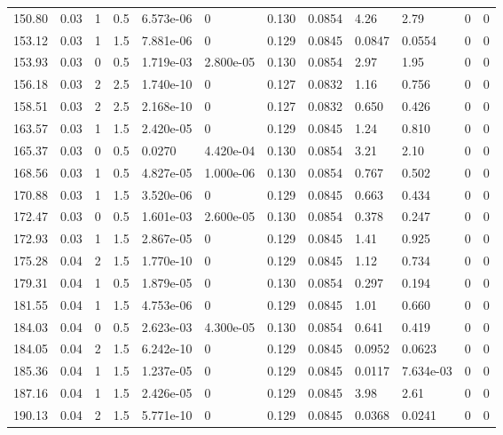 \documentclass[preview]{standalone}
\begin{document}
{{{\begin{tabular}{L{1.2cm}C{1.2cm} C{0.3cm}C{0.5cm} C{1.4cm}C{1.4cm} C{1.4cm}C{1.4cm} C{1.6cm}C{1.6cm} C{1.6cm}C{1.6cm}}
  150.80  &  0.03  & 1     & 0.5 &  6.573e-06  & 0  &  0.130&   0.0854& 4.26 & 2.79   &  0 & 0  \\ 
  153.12  &  0.03  & 1     & 1.5 &  7.881e-06  & 0  &  0.129&   0.0845& 0.0847 & 0.0554   &  0 & 0  \\ 
  153.93  &  0.03  & 0     & 0.5 &  1.719e-03  & 2.800e-05  &  0.130&   0.0854& 2.97 & 1.95   &  0 & 0  \\ 
  156.18  &  0.03  & 2     & 2.5 &  1.740e-10  & 0  &  0.127&   0.0832& 1.16 & 0.756   &  0 & 0  \\ 
  158.51  &  0.03  & 2     & 2.5 &  2.168e-10  & 0  &  0.127&   0.0832& 0.650 & 0.426   &  0 & 0  \\ 
  163.57  &  0.03  & 1     & 1.5 &  2.420e-05  & 0  &  0.129&   0.0845& 1.24 & 0.810   &  0 & 0  \\ 
  165.37  &  0.03  & 0     & 0.5 &  0.0270  & 4.420e-04  &  0.130&   0.0854& 3.21 & 2.10   &  0 & 0  \\ 
  168.56  &  0.03  & 1     & 0.5 &  4.827e-05  & 1.000e-06  &  0.130&   0.0854& 0.767 & 0.502   &  0 & 0  \\ 
  170.88  &  0.03  & 1     & 1.5 &  3.520e-06  & 0  &  0.129&   0.0845& 0.663 & 0.434   &  0 & 0  \\ 
  172.47  &  0.03  & 0     & 0.5 &  1.601e-03  & 2.600e-05  &  0.130&   0.0854& 0.378 & 0.247   &  0 & 0  \\ 
  172.93  &  0.03  & 1     & 1.5 &  2.867e-05  & 0  &  0.129&   0.0845& 1.41 & 0.925   &  0 & 0  \\ 
  175.28  &  0.04  & 2     & 1.5 &  1.770e-10  & 0  &  0.129&   0.0845& 1.12 & 0.734   &  0 & 0  \\ 
  179.31  &  0.04  & 1     & 0.5 &  1.879e-05  & 0  &  0.130&   0.0854& 0.297 & 0.194   &  0 & 0  \\ 
  181.55  &  0.04  & 1     & 1.5 &  4.753e-06  & 0  &  0.129&   0.0845& 1.01 & 0.660   &  0 & 0  \\ 
  184.03  &  0.04  & 0     & 0.5 &  2.623e-03  & 4.300e-05  &  0.130&   0.0854& 0.641 & 0.419   &  0 & 0  \\ 
  184.05  &  0.04  & 2     & 1.5 &  6.242e-10  & 0  &  0.129&   0.0845& 0.0952 & 0.0623   &  0 & 0  \\ 
  185.36  &  0.04  & 1     & 1.5 &  1.237e-05  & 0  &  0.129&   0.0845& 0.0117 & 7.634e-03   &  0 & 0  \\ 
  187.16  &  0.04  & 1     & 1.5 &  2.426e-05  & 0  &  0.129&   0.0845& 3.98 & 2.61   &  0 & 0  \\ 
  190.13  &  0.04  & 2     & 1.5 &  5.771e-10  & 0  &  0.129&   0.0845& 0.0368 & 0.0241   &  0 & 0  \\ 

\end{tabular}}}}
\end{document}
